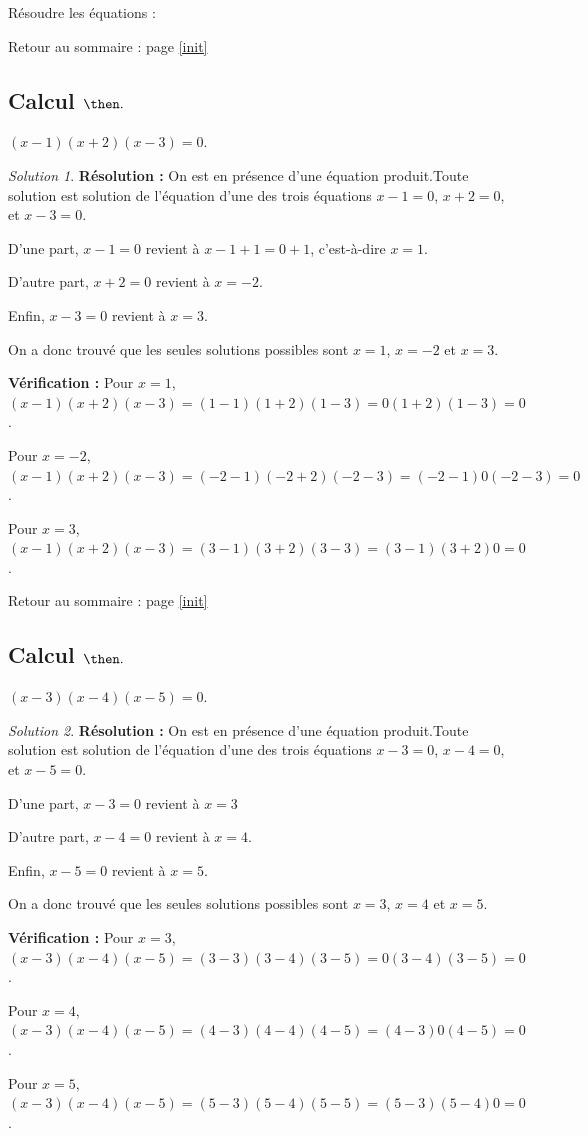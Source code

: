 \documentclass[14pt]{article}
\theoremstyle{remark}
\newtheorem*{sol}{Solution}
\newcounter{n}
\renewcommand{\it}{Retour au sommaire : page \ref{init}
	\subsection{Calcul $ \mathbf{ \then}.$}\label{\then} \stepcounter{n} }
\theoremstyle{plain}
\begin{document}
Résoudre les équations :

\it $(x-1)(x+2)(x-3)=0$. 
\begin{sol}
\textbf{Résolution :}
On est en présence d'une équation produit.Toute solution est solution de l'équation d'une des trois équations $x-1=0$, $x+2=0$, et $x-3=0$. 

D'une part, $x-1=0$ revient à $x-1+1=0+1$, c'est-à-dire $x=1$. 

D'autre part, $x+2=0$ revient à $x=-2$. 

Enfin, $x-3=0$ revient à $x=3$.

On a donc trouvé que les seules solutions possibles sont $x=1$, $x=-2$ et $x=3$. 


\textbf{Vérification :} Pour $x=1$, $(x-1)(x+2)(x-3) = (1-1)(1+2)(1-3) = 0(1+2)(1-3) = 0$.

Pour $x=-2$, $(x-1)(x+2)(x-3) = (-2-1)(-2+2)(-2-3) = (-2-1)0(-2-3) = 0$.

Pour $x=3$, $(x-1)(x+2)(x-3) = (3-1)(3+2)(3-3) = (3-1)(3+2)0=0$.
\end{sol}

\it $(x-3)(x-4)(x-5)=0$. 
\begin{sol}
\textbf{Résolution :}
On est en présence d'une équation produit.Toute solution est solution de l'équation d'une des trois équations $x-3=0$, $x-4=0$, et $x-5=0$. 

D'une part, $x-3=0$ revient à $x=3$

D'autre part, $x-4=0$ revient à $x=4$. 

Enfin, $x-5=0$ revient à $x=5$.

On a donc trouvé que les seules solutions possibles sont $x=3$, $x=4$ et $x=5$. 


\textbf{Vérification :} Pour $x=3$, $(x-3)(x-4)(x-5) = (3-3)(3-4)(3-5)=0(3-4)(3-5)= 0$.

Pour $x=4$, $(x-3)(x-4)(x-5) = (4-3)(4-4)(4-5)=(4-3)0(4-5)= 0$.

Pour $x=5$, $(x-3)(x-4)(x-5) = (5-3)(5-4)(5-5)=(5-3)(5-4)0= 0$.

\end{sol}
\end{document}
